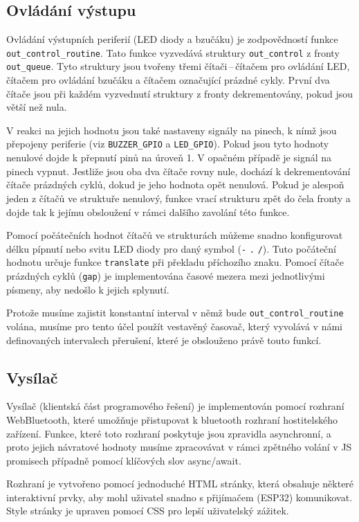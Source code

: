 \documentclass[10pt]{article}
\begin{document}
\subsection{Ovládání výstupu}
\par Ovládání výstupních periferií (LED diody a bzučáku) je zodpovědností funkce \verb|out_control_routine|. Tato funkce vyzvedává struktury \verb|out_control| z fronty \verb|out_queue|. Tyto struktury jsou tvořeny třemi čítači\,--\,čítačem pro ovládání LED, čítačem pro ovládání bzučáku a čítačem označující prázdné cykly. První dva čítače jsou při každém vyzvednutí struktury z fronty dekrementovány, pokud jsou větší než nula. 
\par V reakci na jejich hodnotu jsou také nastaveny signály na pinech, k nímž jsou přepojeny periferie (viz  \verb|BUZZER_GPIO| a  \verb|LED_GPIO|). Pokud jsou tyto hodnoty nenulové dojde k přepnutí pinů na úroveň 1. V opačném případě je signál na pinech vypnut. Jestliže jsou oba dva čítače rovny nule, dochází k dekrementování čítače prázdných cyklů, dokud je jeho hodnota opět nenulová. Pokud je alespoň jeden z čítačů ve struktuře nenulový, funkce vrací strukturu zpět do čela fronty a dojde tak k jejímu obsloužení v rámci dalšího zavolání této funkce.
\par Pomocí počátečních hodnot čítačů ve strukturách můžeme snadno konfigurovat délku pípnutí nebo svitu LED diody pro daný symbol (\verb|-| \verb|.| \verb|/|). Tuto počáteční hodnotu určuje funkce \verb|translate| při překladu příchozího znaku. Pomocí čítače prázdných cyklů (\verb|gap|) je implementována časové mezera mezi jednotlivými písmeny, aby nedošlo k jejich splynutí.
\par Protože musíme zajistit konstantní interval v němž bude \verb|out_control_routine| volána, musíme pro tento účel použít vestavěný časovač, který vyvolává v námi definovaných intervalech přerušení, které je obslouženo právě touto funkcí.

\subsection{Vysílač}
\par Vysílač (klientská část programového řešení) je implementován pomocí rozhraní WebBluetooth, které umožňuje přistupovat k bluetooth rozhraní hostitelského zařízení. Funkce, které toto rozhraní poskytuje jsou zpravidla asynchronní, a proto jejich návratové hodnoty musíme zpracovávat v rámci zpětného volání v JS promisech případně pomocí klíčových slov async/await.
\par Rozhraní je vytvořeno pomocí jednoduché HTML stránky, která obsahuje některé interaktivní prvky, aby mohl uživatel snadno s přijímačem (ESP32) komunikovat. Style stránky je upraven pomocí CSS pro lepší uživatelský zážitek.
\end{document}
